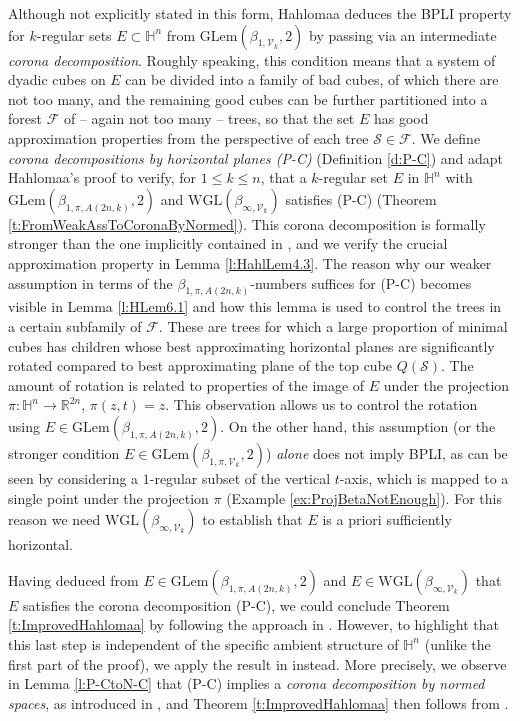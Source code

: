 \documentclass[12pt]{amsart}
\numberwithin{equation}{section}
\theoremstyle{plain}
\theoremstyle{definition}
\theoremstyle{remark}
\begin{document}
Although not explicitly stated in this form, Hahlomaa deduces
the BPLI property for $k$-regular sets  $E\subset \mathbb{H}^n$ from  $\mathrm{GLem}(\beta_{1,\mathcal{V}_k},2)$ by passing via an intermediate  \emph{corona decomposition}. Roughly speaking, this condition means that a system of dyadic cubes on $E$ can be divided into a family of bad cubes, of which there are not too many, and the remaining good cubes can be further partitioned into a forest $\mathcal{F}$ of -- again not too many -- trees, so that the set $E$ has good approximation properties from the perspective of each tree  $\mathcal{S}\in \mathcal{F}$. We define \emph{corona decompositions by horizontal planes (P-C)} (Definition \ref{d:P-C}) and adapt Hahlomaa's proof to verify, for $1\leq k\leq n$, that a $k$-regular set $E$ in $\mathbb{H}^n$ with $\mathrm{GLem}(\beta_{1,\pi,A(2n,k)},2)$ and $\mathrm{WGL}(\beta_{\infty,\mathcal{V}_k})$ satisfies (P-C) (Theorem \ref{t:FromWeakAssToCoronaByNormed}). This corona decomposition is formally stronger than the one implicitly contained in \cite{Hahlomaa},
and we verify the crucial approximation property in Lemma \ref{l:HahlLem4.3}.
The reason why our weaker assumption in terms of the $\beta_{1,\pi,A(2n,k)}$-numbers suffices for (P-C) becomes visible in Lemma \ref{l:HLem6.1} and how this lemma is used to control the trees in a certain subfamily of $\mathcal{F}$. These are trees  for which a large proportion of minimal cubes has children whose best approximating horizontal planes are significantly rotated compared to best approximating plane of the top cube $Q(\mathcal{S})$. The amount of rotation is related to properties of the image of $E$ under the projection $\pi:\mathbb{H}^n \to \mathbb{R}^{2n}$, $\pi(z,t)=z$. This observation allows us to control the  rotation using $E\in \mathrm{GLem}(\beta_{1,\pi,A(2n,k)},2)$. On the other hand, this assumption (or the stronger condition $E\in \mathrm{GLem}(\beta_{1,\pi,\mathcal{V}_k},2)$) \emph{alone} does not imply BPLI, as can be seen  by considering a $1$-regular subset of the vertical $t$-axis, which is mapped to a single point under the projection $\pi$ (Example \ref{ex:ProjBetaNotEnough}). For this reason we need $\mathrm{WGL}(\beta_{\infty,\mathcal{V}_k})$ to establish that $E$ is a priori sufficiently horizontal.



Having deduced from  $E\in \mathrm{GLem}(\beta_{1,\pi,A(2n,k)},2)$ and $E\in \mathrm{WGL}(\beta_{\infty,\mathcal{V}_k})$ that $E$ satisfies the corona decomposition (P-C), we could conclude Theorem \ref{t:ImprovedHahlomaa} by following the approach in \cite{Hahlomaa}. However, to highlight that this last step is independent of  the specific ambient structure of $\mathbb{H}^n$ (unlike the first part of the proof), we apply the result in \cite{Bate} instead. More precisely, we  observe in Lemma \ref{l:P-CtoN-C} that (P-C) implies a \emph{corona decomposition by normed spaces}, as introduced in \cite{Bate}, and Theorem \ref{t:ImprovedHahlomaa}  then follows from \cite[Theorem B]{Bate}. 
\end{document}
